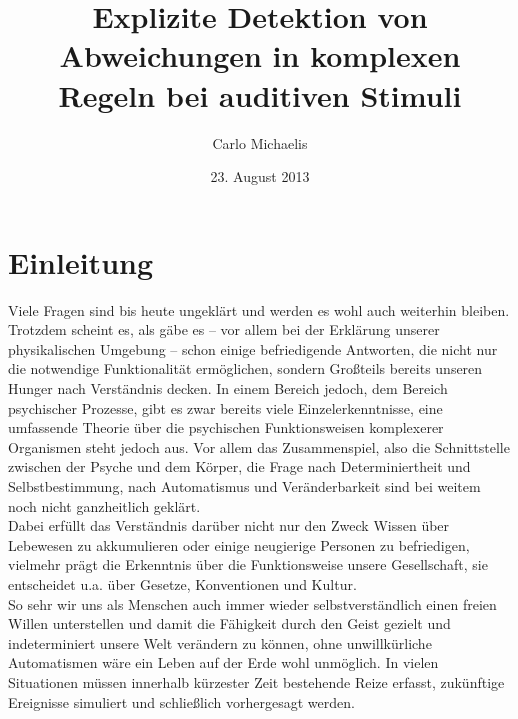 \documentclass[doc,a4paper,12pt]{apa6}
\title{Explizite Detektion von Abweichungen in komplexen Regeln bei auditiven Stimuli}
\author{Carlo Michaelis}
\date{23. August 2013}
\affiliation{Universität Leipzig}
\begin{document}


\section{Einleitung}

Viele Fragen sind bis heute ungeklärt und werden es wohl auch weiterhin bleiben. Trotzdem scheint es, als gäbe es – vor allem bei der Erklärung unserer physikalischen Umgebung – schon einige befriedigende Antworten, die nicht nur die notwendige Funktionalität ermöglichen, sondern Großteils bereits unseren Hunger nach Verständnis decken. In einem Bereich jedoch, dem Bereich psychischer Prozesse, gibt es zwar bereits viele Einzelerkenntnisse, eine umfassende Theorie über die psychischen Funktionsweisen komplexerer Organismen steht jedoch aus. Vor allem das Zusammenspiel, also die Schnittstelle zwischen der Psyche und dem Körper, die Frage nach Determiniertheit und Selbstbestimmung, nach Automatismus und Veränderbarkeit sind bei weitem noch nicht ganzheitlich geklärt.\\
Dabei erfüllt das Verständnis darüber nicht nur den Zweck Wissen über Lebewesen zu akkumulieren oder einige neugierige Personen zu befriedigen, vielmehr prägt die Erkenntnis über die Funktionsweise unsere Gesellschaft, sie entscheidet u.a. über Gesetze, Konventionen und Kultur.\\
So sehr wir uns als Menschen auch immer wieder selbstverständlich einen freien Willen unterstellen und damit die Fähigkeit durch den Geist gezielt und indeterminiert unsere Welt verändern zu können, ohne unwillkürliche Automatismen wäre ein Leben auf der Erde wohl unmöglich. In vielen Situationen müssen innerhalb kürzester Zeit bestehende Reize erfasst, zukünftige Ereignisse simuliert und schließlich vorhergesagt werden.
\end{document}
